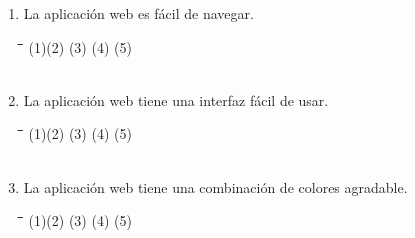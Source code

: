 \documentclass[]{proc}
\begin{document}
\begin{enumerate}
	\item La aplicación web es fácil de navegar.
	
	\begin{tabbing}
		\hspace{1cm}\=\hspace{1cm}\=\hspace{1cm}\=\hspace{1cm}\=\kill
		(1)\>(2)  \>(3)  \>(4)  \>(5) \\\\
	\end{tabbing} 
	
	\item La aplicación web tiene una interfaz fácil de usar.
	
	\begin{tabbing}
		\hspace{1cm}\=\hspace{1cm}\=\hspace{1cm}\=\hspace{1cm}\=\kill
		(1)\>(2)  \>(3)  \>(4)  \>(5) \\\\
	\end{tabbing} 
	
	\item La aplicación web tiene una combinación de colores agradable.
	
	\begin{tabbing}
		\hspace{1cm}\=\hspace{1cm}\=\hspace{1cm}\=\hspace{1cm}\=\kill
		(1)\>(2)  \>(3)  \>(4)  \>(5) \\\\
	\end{tabbing} 
	
\end{enumerate}
\end{document}
